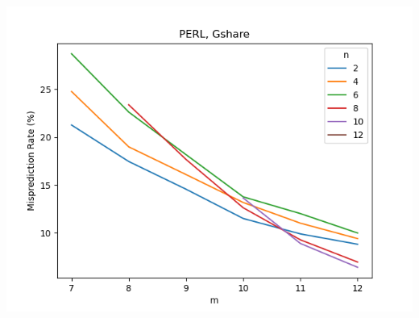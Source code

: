 \documentclass{article}
\begin{document}
\begin{center}
        \includegraphics[scale=0.83]{../graph_logs/PERL_gshare.png}
        
    \end{center}
\end{document}
